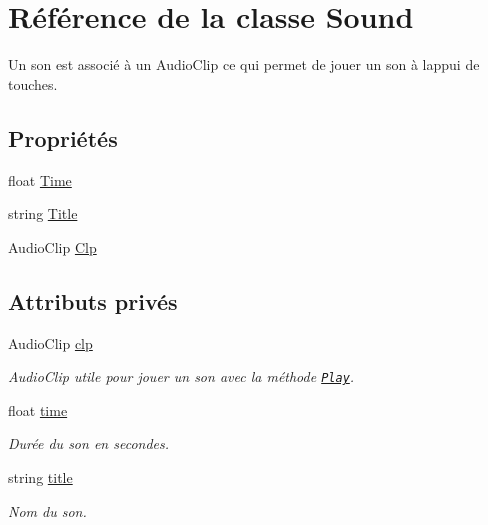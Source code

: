 \hypertarget{class_sound}{}\section{Référence de la classe Sound}
\label{class_sound}


Un son est associé à un Audio\+Clip ce qui permet de jouer un son à l\textquotesingle{}appui de touches.  


\subsection*{Propriétés}
\begin{DoxyCompactItemize}
\item 
float \hyperlink{class_sound_af23b0067b9f8a8431635e45467a26f47}{Time}
\item 
string \hyperlink{class_sound_a2e949808e2fbfbc883a94e8743d5297b}{Title}
\item 
Audio\+Clip \hyperlink{class_sound_a7132714a2858529a7ead633608daef67}{Clp}
\end{DoxyCompactItemize}
\subsection*{Attributs privés}
\begin{DoxyCompactItemize}
\item 
Audio\+Clip \hyperlink{class_sound_ab3aef1528cd38ad28e2f9843d56afbbe}{clp}
\begin{DoxyCompactList}\small\item\em Audio\+Clip utile pour jouer un son avec la méthode \href{http://docs.unity3d.com/ScriptReference/AudioSource.Play.html}{\tt Play}. \end{DoxyCompactList}\item 
float \hyperlink{class_sound_a2b67e874a75d0d390d37cdbaa2f51087}{time}
\begin{DoxyCompactList}\small\item\em Durée du son en secondes. \end{DoxyCompactList}\item 
string \hyperlink{class_sound_a17853cdf74f081a79ba4e658c6e25a13}{title}
\begin{DoxyCompactList}\small\item\em Nom du son. \end{DoxyCompactList}\end{DoxyCompactItemize}


